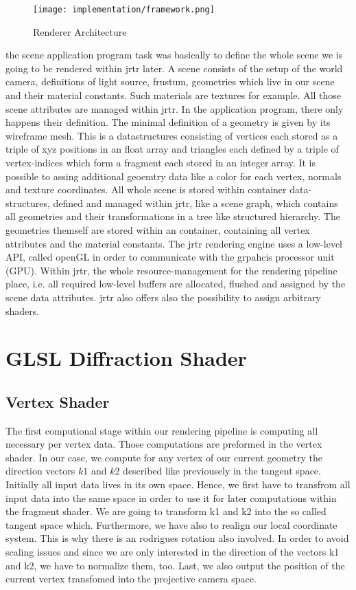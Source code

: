 \begin{figure}[H]
  \centering
  \texttt{[image: implementation/framework.png]}
  \label{rendererArchitecture}
  \caption{Renderer Architecture}
\end{figure}

the scene application program task was basically to define the whole scene we is going to be rendered within jrtr later.
A scene consists of the setup of the world camera, definitions of light source, frustum, geometries which live in our scene and their material constants. Such materials are textures for example. All those scene attributes are managed within jrtr. In the application program, there only happens their definition.
The minimal definition of a geometry is given by its wireframe mesh. This is a datastructures consisting of vertices each stored as a triple of xyz positions in an float array and triangles each defined by a triple of vertex-indices which form a fragment each stored in an integer array. It is possible to assing additional geoemtry data like a color for each vertex, normals and texture coordinates.
All whole scene is stored within container data-structures, defined and managed within jrtr, like a scene graph, which contains all geometries and their transformations in a tree like structured hierarchy. The geometries themself are stored within an container, containing all vertex attributes and the material constants.
The jrtr rendering engine uses a low-level API, called openGL in order to communicate with the grpahcis processor unit (GPU). Within jrtr, the whole resource-management for the rendering pipeline place, i.e. all required low-level buffers are allocated, flushed and assigned by the scene data attributes. jrtr also offers also the possibility to assign arbitrary shaders.

\section{GLSL Diffraction Shader}
\subsection{Vertex Shader}
The first computional stage within our rendering pipeline is computing all necessary per vertex data. Those computations are preformed in the vertex shader. In our case, we compute for any vertex of our current geometry the direction vectors $k1$ and $k2$ described like previousely in the tangent space. Initially all input data lives in its own space. Hence, we first have to transfrom all input data into the same space in order to use it for later computations within the fragment shader. We are going to transform k1 and k2 into the so called tangent space which. Furthermore, we have also to realign our local coordinate system. This is why there is an rodrigues rotation also involved. In order to avoid scaling issues and since we are only interested in the direction of the vectors k1 and k2, we have to normalize them, too. Last, we also output the position of the current vertex transfomed into the projective camera space.
  

